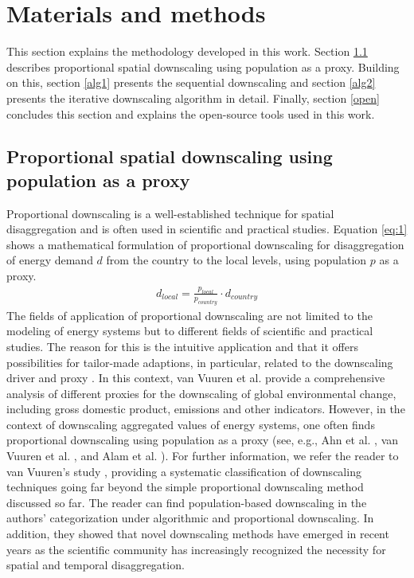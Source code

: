 \section{Materials and methods}\label{methodology}
This section explains the methodology developed in this work. Section \ref{pop} describes proportional spatial downscaling using population as a proxy. Building on this, section \ref{alg1} presents the sequential downscaling and section \ref{alg2} presents the iterative downscaling algorithm in detail. Finally, section \ref{open} concludes this section and explains the open-source tools used in this work.

\subsection{Proportional spatial downscaling using population as a proxy}\label{pop}
Proportional downscaling is a well-established technique for spatial disaggregation and is often used in scientific and practical studies. Equation \ref{eq:1} shows a mathematical formulation of proportional downscaling for disaggregation of energy demand $d$ from the country to the local levels, using population $p$ as a proxy.
\begin{align}\label{eq:1}
d_{local}=\frac{p_{local}}{p_{country}} \cdot d_{country}
\end{align}
The fields of application of proportional downscaling are not limited to the modeling of energy systems but to different fields of scientific and practical studies. The reason for this is the intuitive application and that it offers possibilities for tailor-made adaptions, in particular, related to the downscaling driver and proxy \cite{van2006downscaling}. In this context, van Vuuren et al. \cite{van2006downscaling} provide a comprehensive analysis of different proxies for the downscaling of global environmental change, including gross domestic product, emissions and other indicators. However, in the context of downscaling aggregated values of energy systems, one often finds proportional downscaling using population as a proxy (see, e.g., Ahn et al. \cite{ahn2019downscaled}, van Vuuren et al. \cite{van2010downscaling}, and Alam et al. \cite{alam2018downscaling}). For further information, we refer the reader to van Vuuren's study \cite{van2010downscaling}, providing a systematic classification of downscaling techniques going far beyond the simple proportional downscaling method discussed so far. The reader can find population-based downscaling in the authors' categorization under algorithmic and proportional downscaling. In addition, they showed that novel downscaling methods have emerged in recent years as the scientific community has increasingly recognized the necessity for spatial and temporal disaggregation.

